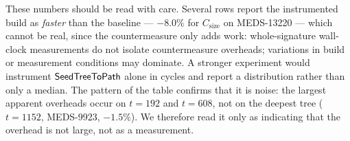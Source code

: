These numbers should be read with care. Several rows report the instrumented
build as \emph{faster} than the baseline --- $-8.0\%$ for $C_{\mathrm{size}}$
on MEDS-13220 --- which cannot be real, since the countermeasure only adds
work: whole-signature wall-clock measurements do not isolate countermeasure
overheads; variations in build or measurement conditions may dominate. A stronger experiment would instrument $\mathsf{SeedTreeToPath}$ alone in cycles
and report a distribution rather than only a median. The pattern of the table confirms that it is noise:
the largest apparent overheads occur on $t = 192$ and $t = 608$, not on the
deepest tree ($t = 1152$, MEDS-9923, $-1.5\%$). We therefore read it only as
indicating that the overhead is not large, not as a measurement.
